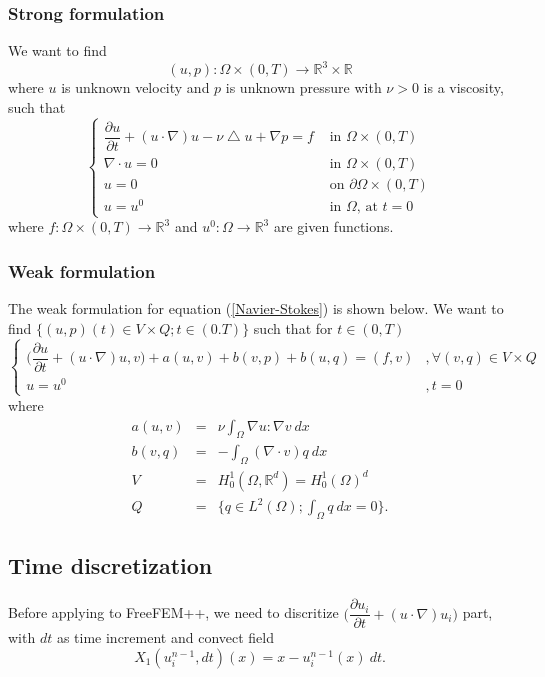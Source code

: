 \documentclass[a4paper]{article}
\newcommand{\R}{\mathbb{R}}
\begin{document}
\subsubsection{Strong formulation}
We want to find \[(u,p) : \Omega \times (0,T) \rightarrow \R^3 \times \R\] where $ u $ is unknown velocity and $ p $ is unknown pressure with $ \nu > 0 $ is a viscosity, such that
\begin{equation}\label{Navier-Stokes}
\begin{cases}
\dfrac{\partial u}{\partial t} + (u \cdot \nabla) u - \nu \bigtriangleup u + \nabla p = f & \text{ in } \Omega \times (0,T)\\
\nabla \cdot u = 0 & \text{ in } \Omega \times (0,T)\\
u = 0 & \text{ on } \partial \Omega \times (0,T)\\
u = u^0 & \text{ in } \Omega \text{, at } t=0
\end{cases}
\end{equation}
where $ f : \Omega \times (0,T) \rightarrow \R^3 $ and $ u^0 : \Omega \rightarrow \R^3 $ are given functions.
\subsubsection{Weak formulation}
The weak formulation for equation (\ref{Navier-Stokes}) is shown below. We want to find $ \{ (u,p)(t) \in V \times Q ; t \in (0.T) \} $ such that for $ t \in (0,T) $
\begin{equation} \label{NS_Weak}
\begin{cases}
\big( \dfrac{\partial u}{\partial t} + (u \cdot \nabla)u,v \big) + a(u,v) + b(v,p) + b(u,q) = (f,v) & ,\forall(v,q)\in V\times Q \\ u=u^{0} & , t=0
\end{cases}
\end{equation}
where
\begin{eqnarray}\nonumber
a(u,v) &=& \nu \int_{\Omega} \nabla u : \nabla v \ dx \\ \nonumber
b(v,q) &=& - \int_{\Omega} (\nabla \cdot v) q \ dx \\ \nonumber
V &=& H_{0}^{1}(\Omega, \R^d) = H_{0}^{1}(\Omega)^d \\ \nonumber
Q &=& \{ q\in L^2(\Omega) ; \int_{\Omega} q \ dx=0 \}.
\end{eqnarray}

\subsection{Time discretization}
Before applying to FreeFEM++, we need to discritize $ \Big(\dfrac{\partial u_{i}}{\partial t} + (u \cdot \nabla)u_{i}\Big) $ part, with $ dt $ as time increment and convect field
\[ X_{1}(u_{i}^{n-1},dt)(x) = x - u_{i}^{n-1}(x)\ dt.\]
\end{document}
